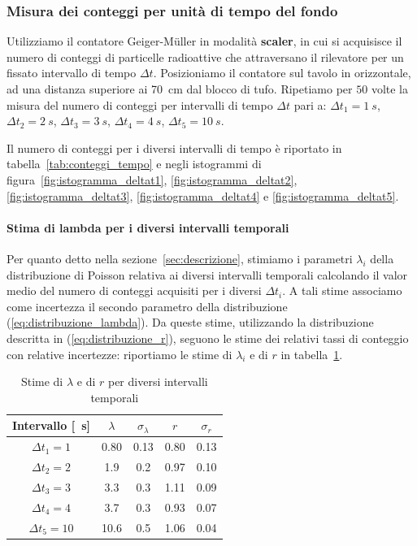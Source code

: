 \documentclass[10pt,oneside,a4paper]{article}
\begin{document}
\subsubsection{Misura dei conteggi per unità di tempo del fondo}
Utilizziamo il contatore Geiger-Müller in modalità \textbf{scaler}, in cui si acquisisce il numero di conteggi di particelle radioattive che attraversano il rilevatore per un fissato intervallo di tempo $\Delta t$. Posizioniamo il contatore sul tavolo in orizzontale, ad una distanza superiore ai \SI{70}{cm} dal blocco di tufo. Ripetiamo per $50$ volte la misura del numero di conteggi per intervalli di tempo $\Delta t$ pari a: $\Delta t_1 = \SI{1}{s}$, $\Delta t_2 = \SI{2}{s}$, $\Delta t_3 = \SI{3}{s}$, $\Delta t_4 = \SI{4}{s}$, $\Delta t_5 = \SI{10}{s}$.

Il numero di conteggi per i diversi intervalli di tempo è riportato in tabella~\ref{tab:conteggi_tempo} e negli istogrammi di figura~\ref{fig:istogramma_deltat1}, \ref{fig:istogramma_deltat2}, \ref{fig:istogramma_deltat3}, \ref{fig:istogramma_deltat4} e \ref{fig:istogramma_deltat5}.
\paragraph{Stima di lambda per i diversi intervalli temporali}
Per quanto detto nella sezione~\ref{sec:descrizione}, stimiamo i parametri $\lambda_i$ della distribuzione di Poisson relativa ai diversi intervalli temporali calcolando il valor medio del numero di conteggi acquisiti per i diversi $\Delta t_i$. A tali stime associamo come incertezza il secondo parametro della distribuzione (\ref{eq:distribuzione_lambda}). Da queste stime, utilizzando la distribuzione descritta in (\ref{eq:distribuzione_r}), seguono le stime dei relativi tassi di conteggio con relative incertezze: riportiamo le stime di $\lambda_i$  e di $r$ in tabella~\ref{tab:lambda_r_conteggi}.
\begin{table}[ht]
\caption{Stime di $\lambda$ e di $r$ per diversi intervalli temporali}
\label{tab:lambda_r_conteggi}
\centering
\begin{tabular}{c|cc|cc}
\toprule
Intervallo [\SI{}{s}] & $\lambda$ & $\sigma_{\lambda}$ & $r$ & $\sigma_{r}$ \\
\hline 
$\Delta t_1 = 1$ & 0.80  & 0.13 & 0.80 & 0.13\\ 
$\Delta t_2 = 2$ & 1.9  & 0.2 & 0.97 & 0.10\\
$\Delta t_3 = 3$ & 3.3  & 0.3  & 1.11 & 0.09\\
$\Delta t_4 = 4$ & 3.7  & 0.3 & 0.93 & 0.07\\
$\Delta t_5 = 10$ & 10.6 & 0.5 & 1.06 & 0.04\\
\bottomrule
\end{tabular}
\end{table}
\end{document}
